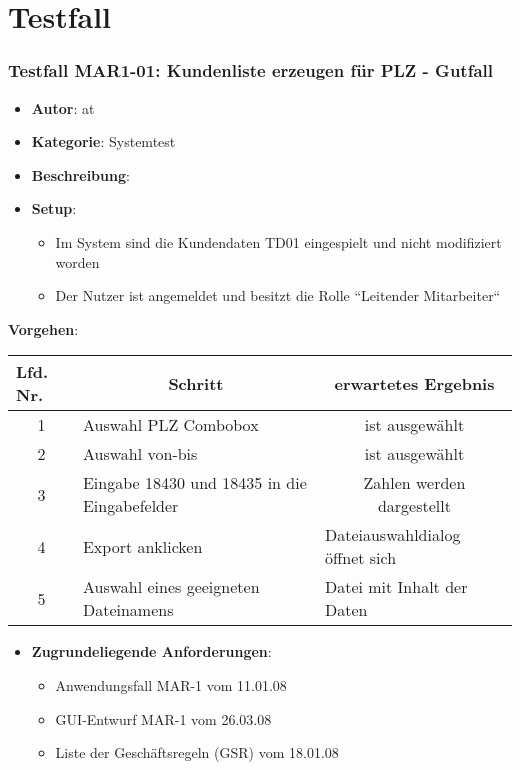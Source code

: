 \section{Testfall}

\subsubsection*{Testfall MAR1-01: Kundenliste erzeugen für PLZ - Gutfall}

\begin{itemize}
    \item[] \textbf{Autor}: at
    \item[] \textbf{Kategorie}: Systemtest
    \item[] \textbf{Beschreibung}:
    \item[] \textbf{Setup}:
    \begin{itemize}
        \item Im System sind die Kundendaten TD01 eingespielt und nicht modifiziert worden
        \item Der Nutzer ist angemeldet und besitzt die Rolle ``Leitender Mitarbeiter``
    \end{itemize}
\end{itemize}

\noindent
\textbf{Vorgehen}:
\begin{table}[]
    \centering
    \setlength{\tabcolsep}{0.5em}
    \def\arraystretch{1.5}
    \begin{tabular}{|c|l|c|}
        \hline
        \multicolumn{1}{|l|}{\textbf{Lfd. Nr.}} & \multicolumn{1}{c|}{\textbf{Schritt}}        & \textbf{erwartetes Ergebnis}                        \\ \hline
        1                                       & Auswahl PLZ Combobox                         & ist ausgewählt                                      \\ \hline
        2                                       & Auswahl von-bis                              & ist ausgewählt                                      \\ \hline
        3                                       & Eingabe 18430 und 18435 in die Eingabefelder & Zahlen werden dargestellt                           \\ \hline
        4                              & Export anklicken                             & \multicolumn{1}{l|}{Dateiauswahldialog öffnet sich} \\ \hline
        5                              & Auswahl eines geeigneten Dateinamens         & \multicolumn{1}{l|}{Datei mit Inhalt der Daten}     \\ \hline
    \end{tabular}
\end{table}

\begin{itemize}
    \item[] \textbf{Zugrundeliegende Anforderungen}:
    \begin{itemize}
        \item Anwendungsfall MAR-1 vom 11.01.08
        \item GUI-Entwurf MAR-1 vom 26.03.08
        \item Liste der Geschäftsregeln (GSR) vom 18.01.08
    \end{itemize}
\end{itemize}
